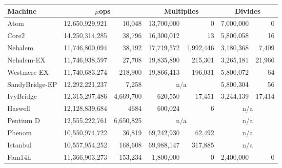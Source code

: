 \begin{tabular}{|l||r@{$\pm$}r||r@{$\pm$}r||r@{$\pm$}r|}

\hline
Machine   & \multicolumn{2}{c||}{$\mu$ops} & \multicolumn{2}{c||}{Multiplies} & \multicolumn{2}{c|}{Divides} \\

\hline
\hline

Atom           & 12,650,929,921 & 10,048 &  13,700,000 &  0     &   7,000,000 & 0      \\
\hline
Core2          & 14,250,314,285 & 38,796 &  16,300,012 & 13     &   5,800,058 & 16 \\
\hline
Nehalem        & 11,746,800,094 & 38,192 & 17,719,572 & 1,992,446 & 3,180,368 & 7,409    \\
\hline
Nehalem-EX     & 11,746,938,597 & 27,708 & 19,835,890 & 215,301   &  3,265,181 & 21,966    \\
\hline
Westmere-EX       & 11,740,683,274 & 218,900 & 19,866,413 & 196,031 & 5,800,072           &  64 \\
\hline
SandyBridge-EP  & 12,292,221,237 &  7,258 & \multicolumn{2}{c||}{n/a}   &  5,800,304 & 56    \\
\hline
IvyBridge      & 12,315,297,486 & 4,669,700 & 620,550    & 17,451           &  3,244,139          & 17,414 \\
\hline
Haswell		& 12,128,839,684 & 4684 & 600,024 & 6 & \multicolumn{2}{c||}{n/a} \\
\hline
Pentium D      & 12,555,222,761 & 6,650,825 & \multicolumn{2}{c||}{n/a} & \multicolumn{2}{c|}{n/a} \\
\hline
Phenom         & 10,550,974,722 & 36,819 &  69,242,930 & 62,492  & \multicolumn{2}{c|}{n/a} \\
\hline
Istanbul       & 10,557,954,252 & 168,608 &  69,988,147 & 317,885    & \multicolumn{2}{c|}{n/a} \\
\hline
Fam14h         & 11,366,903,273 & 153,234   &   1,800,000 & 0    & 2,400,000 & 0 \\
\hline
\end{tabular}
%

